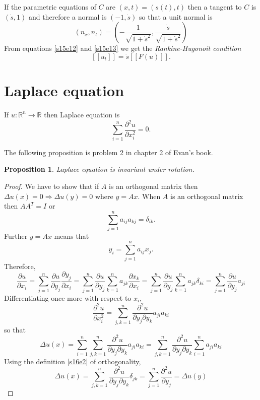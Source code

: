 \documentclass{article}
\newcommand{\pd}[2]{\frac{\partial{#1}}{\partial{#2}}}
\theoremstyle{plain}
\numberwithin{thm}{section}
\theoremstyle{plain}
\newtheorem{prop}{Proposition}
\numberwithin{prop}{section}
\theoremstyle{definition}
\numberwithin{defn}{section}
\theoremstyle{remark}
\numberwithin{equation}{section}
\begin{document}
If the parametric equations of $C$ are $(x, t) = (s(t), t)$ then a tangent to $C$ is $(\dot{s}, 1)$
and therefore a normal is $(-1, \dot{s})$ so that a unit normal is 
\begin{equation}\label{s15e13}
(n_x, n_t) = \left(-\frac{1}{\sqrt{1 + \dot{s}^2}}, \frac{\dot{s}}{\sqrt{1 + \dot{s}^2}}\right)
\end{equation}
From equations \eqref{s15e12} and \eqref{s15e13} we get the \emph{Rankine-Hugonoit condition}
\begin{equation}\label{s15e14}
[[u_t]] = \dot{s}[[F(u)]].
\end{equation}

\section{Laplace equation}\label{s16}
If $u: \mathbb{R}^n \rightarrow \mathbb{R}$ then Laplace equation is
\begin{equation}\label{s16e1}
\sum_{i=1}^n\frac{\partial^2 u}{\partial x_i^2} = 0.
\end{equation}

The following proposition is problem 2 in chapter 2 of Evan's book.
\begin{prop}\label{s16p1}
Laplace equation is invariant under rotation.
\end{prop}
\begin{proof}
We have to show that if $A$ is an orthogonal matrix then $\Delta u(x) = 0 \Rightarrow \Delta u(y) = 0$ 
where $y = Ax$. When $A$ is an orthogonal matrix then $AA^T = I$ or
\begin{equation}\label{s16e2}
\sum_{j = 1}^n a_{ij}a_{kj} = \delta_{ik}.
\end{equation}
Further $y = Ax$ means that
\begin{equation}\label{s16e3}
y_i = \sum_{j = 1}^n a_{ij} x_j.
\end{equation}
Therefore,
\[
\pd{u}{x_i} = \sum_{j=1}^n\pd{u}{y_j}\pd{y_j}{x_i} = \sum_{j = 1}^n\pd{u}{y_j}\sum_{k=1}^n a_{jk}
\pd{x_k}{x_i} = \sum_{j = 1}^n\pd{u}{y_j}\sum_{k=1}^n a_{jk}\delta_{ki} = 
\sum_{j = 1}^n\pd{u}{y_j}a_{ji}
\]
Differentiating once more with respect to $x_i$,
\[
\frac{\partial^2 u}{\partial x_i^2} = 
\sum_{j,k = 1}^n \frac{\partial^2 u}{\partial y_j \partial y_k} a_{ji}a_{ki}
\]
so that
\[
\Delta u(x) = \sum_{i=1}^n \sum_{j,k = 1}^n \frac{\partial^2 u}{\partial y_j \partial y_k} a_{ji}
a_{ki} = \sum_{j,k = 1}^n \frac{\partial^2 u}{\partial y_j \partial y_k} \sum_{i=1}^n a_{ji}a_{ki}
\]
Using the definition \eqref{s16e2} of orthogonality,
\[
\Delta u(x) = 
\sum_{j,k = 1}^n \frac{\partial^2 u}{\partial y_j \partial y_k} \delta_{jk} = 
\sum_{j=1}^n \frac{\partial^2 u}{\partial y_j} = \Delta u(y)
\]
\end{proof}
\end{document}
